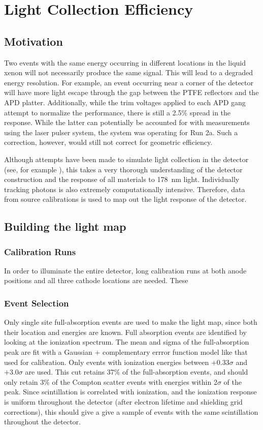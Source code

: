 \documentclass[herrin-thesis.tex]{subfiles}
\begin{document}
\chapter{Light Collection Efficiency}
\label{app:lightmap}

\section{Motivation}
Two events with the same energy occurring in different locations in the liquid xenon will not necessarily produce the same signal. This will lead to a degraded energy resolution. For example, an event occurring near a corner of the detector will have more light escape through the gap between the PTFE reflectors and the APD platter. Additionally, while the trim voltages applied to each APD gang attempt to normalize the performance, there is still a 2.5\% spread in the response. While the latter can potentially be accounted for with measurements using the laser pulser system, the system was operating for Run 2a. Such a correction, however, would still not correct for geometric efficiency.

Although attempts have been made to simulate light collection in the detector (see, for example \cite{Mackay:2011fk}), this takes a very thorough understanding of the detector construction and the response of all materials to \SI{178}{\nm} light. Individually tracking photons is also extremely computationally intensive. Therefore, data from source calibrations is used to map out the light response of the detector.

\section{Building the light map}
\subsection{Calibration Runs}
In order to illuminate the entire detector, long calibration runs at both anode positions and all three cathode locations are needed. These

\subsection{Event Selection}
Only single site full-absorption events are used to make the light map, since both their location and energies are known. Full absorption events are identified by looking at the ionization spectrum. The mean and sigma of the full-absorption peak are fit with a Gaussian + complementary errror function model like that used for calibration. Only events with ionization energies between \(+0.33\sigma\) and \(+3.0\sigma\) are used. This cut retains 37\% of the full-absorption events, and should only retain 3\% of the Compton scatter events with energies within 2\(\sigma\) of the peak. Since scintillation is correlated with ionization, and the ionization response is uniform throughout the detector (after electron lifetime and shielding grid corrections), this should give a give a sample of events with the same scintillation throughout the detector.
\end{document}

